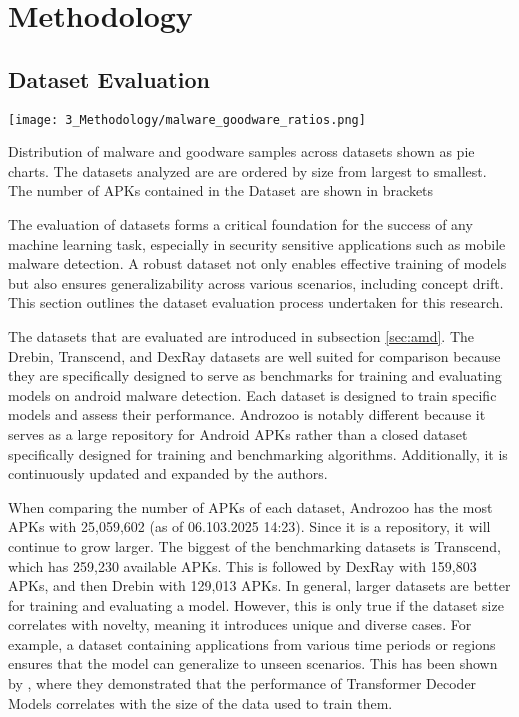 \chapter{Methodology} %

\label{Methodology} %

\section{Dataset Evaluation}
\label{sec:datasets}

\begin{marginfigure}[] %
    \texttt{[image: 3\_Methodology/malware\_goodware\_ratios.png]}
    \caption{\label{fig:malratios}
    Distribution of malware and goodware samples across datasets shown as pie charts.
    The datasets analyzed are are ordered by size from largest to smallest.
    The number of APKs contained in the Dataset are shown in brackets}
\end{marginfigure}

The evaluation of datasets forms a critical foundation for the success of any machine learning task, 
especially in security sensitive applications such as mobile malware detection. 
A robust dataset not only enables effective training of models but also ensures generalizability 
across various scenarios, including concept drift. 
This section outlines the dataset evaluation process undertaken for this research.

The datasets that are evaluated are introduced in subsection \ref{sec:amd}.
The Drebin, Transcend, and DexRay datasets are well suited for comparison because they are 
specifically designed to serve as benchmarks for training and evaluating models on android malware detection. 
Each dataset is designed to train specific models and assess their performance. 
Androzoo is notably different because it serves as a large repository for Android APKs rather 
than a closed dataset specifically designed for training and benchmarking algorithms. 
Additionally, it is continuously updated and expanded by the authors.

When comparing the number of APKs of each dataset, Androzoo has the most APKs with 25,059,602 
(as of 06.103.2025 14:23). 
Since it is a repository, it will continue to grow larger.
The biggest of the benchmarking datasets is Transcend, which has 259,230 available APKs. 
This is followed by DexRay with 159,803 APKs, and then Drebin with 129,013 APKs. 
In general, larger datasets are better for training and evaluating a model. 
However, this is only true if the dataset size correlates with novelty, 
meaning it introduces unique and diverse cases. 
For example, a dataset containing applications from various time periods or regions 
ensures that the model can generalize to unseen scenarios. 
This has been shown by \cite{scalinglaws}, 
where they demonstrated that the performance of Transformer Decoder Models 
correlates with the size of the data used to train them.

